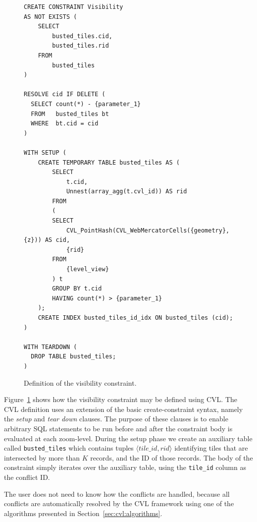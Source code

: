 \documentclass[11pt, oneside]{report}
\begin{document}
\begin{figure}[htbp]
\begin{center}
\begin{lstlisting}
CREATE CONSTRAINT Visibility
AS NOT EXISTS (
    SELECT
        busted_tiles.cid,
        busted_tiles.rid
    FROM
        busted_tiles
)

RESOLVE cid IF DELETE (
  SELECT count(*) - {parameter_1}
  FROM   busted_tiles bt
  WHERE  bt.cid = cid
)

WITH SETUP (
    CREATE TEMPORARY TABLE busted_tiles AS (
        SELECT
            t.cid,
            Unnest(array_agg(t.cvl_id)) AS rid
        FROM
        (
        SELECT
            CVL_PointHash(CVL_WebMercatorCells({geometry}, {z})) AS cid,
            {rid}
        FROM
            {level_view}
        ) t
        GROUP BY t.cid
        HAVING count(*) > {parameter_1}
    );
    CREATE INDEX busted_tiles_id_idx ON busted_tiles (cid);
)

WITH TEARDOWN (
  DROP TABLE busted_tiles;
)
\end{lstlisting}
\caption{Definition of the visibility constraint.}
\label{fig:visibility:definition}
\end{center}
\end{figure}



Figure~\ref{fig:visibility:definition} shows how the visibility constraint may be defined using CVL. The CVL definition uses an extension of the basic create-constraint syntax, namely the \emph{setup} and \emph{tear down} clauses. 
The purpose of these clauses is to enable arbitrary SQL statements to be run before and after the constraint body is evaluated at each zoom-level. During the setup phase we create an auxiliary table called \texttt{busted\_tiles} which contains tuples $\langle tile\_id, rid \rangle$ identifying tiles that are intersected by more than $K$ records, and the ID of those records. The body of the constraint simply iterates over the auxiliary table, using the \texttt{tile\_id} column as the conflict ID.




The user does not need to know how the conflicts are handled, because all conflicts are automatically resolved by the CVL framework using one of the algorithms presented in Section~\ref{sec:cvl:algorithms}.
\end{document}
